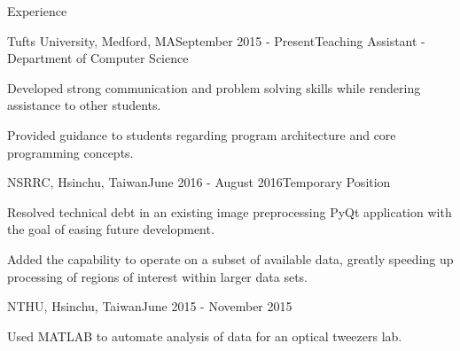 \documentclass{resume} %
\begin{document}

\bigskip
\bigskip
\bigskip

\begin{rSection}{Experience}


\begin{rSubsection}{Tufts University, Medford, MA}{September 2015 -
    Present}{Teaching Assistant - Department of Computer Science}

\item Developed strong communication and problem solving skills while
    rendering assistance to other students.
\item Provided guidance to students regarding program architecture and core
    programming concepts.

\end{rSubsection}

\begin{rSubsection}{NSRRC, Hsinchu, Taiwan}{June 2016 - August 2016}{Temporary
    Position}

\item Resolved technical debt in an existing image preprocessing PyQt
    application with the goal of easing future development.
\item Added the capability to operate on a subset of available data, greatly
    speeding up processing of regions of interest within larger data sets.

\end{rSubsection}

\begin{rSubsection}{NTHU, Hsinchu, Taiwan}{June 2015 - November 2015}{}

\item Used MATLAB to automate analysis of data for an optical tweezers lab.

\end{rSubsection}

\bigskip

\end{rSection}
\end{document}
